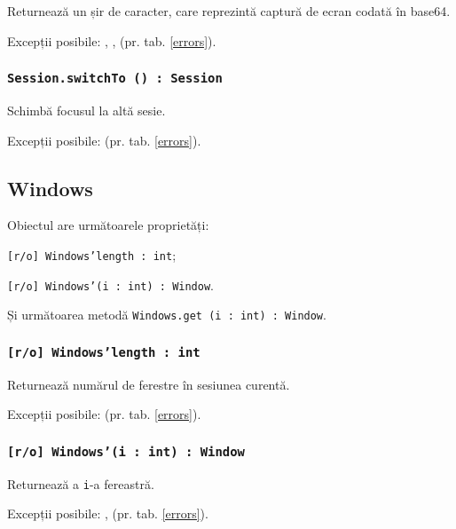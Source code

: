 Returnează un șir de caracter, care reprezintă captură de ecran codată în base64.

Excepții posibile: , ,  (pr. tab. \ref{errors}).

\subsubsection{\texttt{Session.switchTo () : Session}}

Schimbă focusul la altă sesie.

Excepții posibile:  (pr. tab. \ref{errors}).


\subsection{{\color{orange} Windows}}

Obiectul \windows{} are următoarele proprietăți:
\begin{icItems}
	\item \texttt{[r/o] Windows'length : int};
	\item \texttt{[r/o] Windows'(i : int) : Window}.
\end{icItems}

Și următoarea metodă \texttt{Windows.get (i : int) : Window}.

\subsubsection{\texttt{[r/o] Windows'length : int}}

Returnează numărul de ferestre în sesiunea curentă.

Excepții posibile:  (pr. tab. \ref{errors}).

\subsubsection{\texttt{[r/o] Windows'(i : int) : Window}}

Returnează a \texttt{i}-a fereastră.

Excepții posibile: ,  (pr. tab. \ref{errors}).

